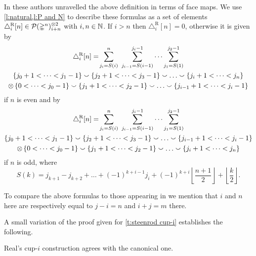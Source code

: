 In \cite[Corollary 3.2]{gonzalez-diaz1999steenrod} these authors unravelled the above definition in terms of face maps.
We use \cref{l:natural,l:P and N} to describe these formulas as a set of elements $\triangle_i^{\mathrm{R}} [n] \in \mathcal{P}(\mathbb{\Delta}^n)^{\otimes 2}_{i+n}$ with $i,n \in \mathbb{N}$.
If $i > n$ then $\triangle_i^{\mathrm{R}} [n] = 0$, otherwise it is given by
\begin{multline*}
\triangle^{\mathrm{R}}_i [n] = \!
\sum_{j_i=S(i)}^{n} \ \sum_{j_{i-1}=S(i-1)}^{j_i-1} \dots \sum_{j_1=S(1)}^{j_2-1} \\
\{j_0+1 < \dots < j_1-1\} \union \{j_2+1 < \dots < j_3-1\} \union \dots \union \{j_i+1 < \dots < j_n\} \\ \ot \,
\{0 < \dots < j_0-1\} \union \{j_1+1 < \dots < j_2-1\} \union \dots \union \{j_{i-1}+1 < \dots < j_i-1\}
\end{multline*}
if $n$ is even and by
\begin{multline*}
\triangle^{\mathrm{R}}_i [n] = \!
\sum_{j_i=S(i)}^{n} \ \sum_{j_{i-1}=S(i-1)}^{j_i-1} \dots \sum_{j_1=S(1)}^{j_2-1} \\
\{j_0+1 < \dots < j_1-1\} \union \{j_2+1 < \dots < j_3-1\} \union \dots \union \{j_{i-1}+1 < \dots < j_i-1\} \\ \ot \,
\{0 < \dots < j_0-1\} \union \{j_1+1 < \dots < j_2-1\} \union \dots \union \{j_i+1 < \dots < j_n\}
\end{multline*}
if $n$ is odd, where
\[
S(k) = j_{k+1} - j_{k+2} + \dots + (-1)^{k+i-1} j_i + (-1)^{k+i} \left\lfloor \frac{n+1}{2} \right\rfloor + \left\lfloor \frac{k}{2} \right\rfloor .
\]

\begin{remark}
	To compare the above formulas to those appearing in \cite[Corollary~3.2]{gonzalez-diaz1999steenrod} we mention that $i$ and $n$ here are respectively equal to $j-i=n$ and $i+j=m$ there.
\end{remark}

A small variation of the proof given for \cref{t:steenrod cup-i} establishes the following.

\begin{theorem}
	Real's \mbox{cup-$i$} construction agrees with the canonical one.
\end{theorem}

